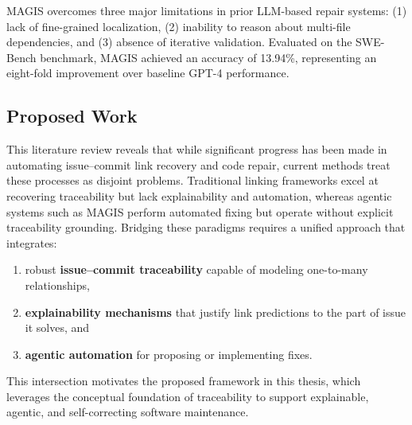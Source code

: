 MAGIS overcomes three major limitations in prior LLM-based repair systems:
(1) lack of fine-grained localization,  
(2) inability to reason about multi-file dependencies, and  
(3) absence of iterative validation.  
Evaluated on the SWE-Bench benchmark, MAGIS achieved an accuracy of 13.94\%, representing an eight-fold improvement over baseline GPT-4 performance.



\subsection{Proposed Work}
This literature review reveals that while significant progress has been made in automating issue–commit link recovery and code repair, current methods treat these processes as disjoint problems. Traditional linking frameworks excel at recovering traceability but lack explainability and automation, whereas agentic systems such as MAGIS perform automated fixing but operate without explicit traceability grounding.  
Bridging these paradigms requires a unified approach that integrates:
\begin{enumerate}
    \item robust \textbf{issue–commit traceability} capable of modeling one-to-many relationships,
    \item \textbf{explainability mechanisms} that justify link predictions to the part of issue it solves, and
    \item \textbf{agentic automation} for proposing or implementing fixes.
\end{enumerate}
This intersection motivates the proposed framework in this thesis, which leverages the conceptual foundation of traceability to support explainable, agentic, and self-correcting software maintenance.
